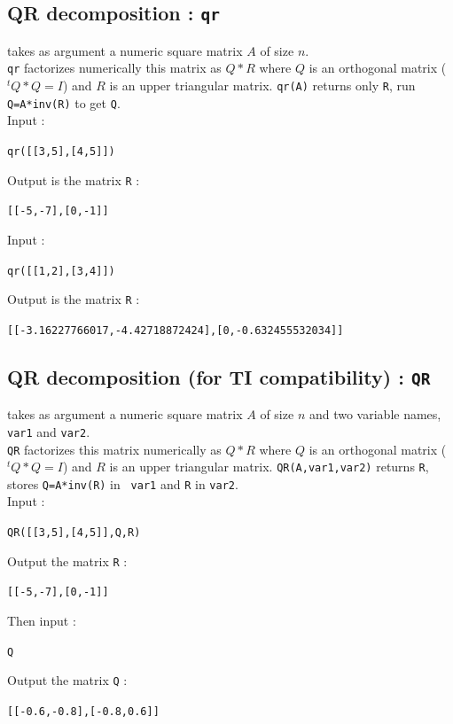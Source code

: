 \documentclass[a4paper,11pt]{book}
\begin{document}
\subsection{QR decomposition : {\tt qr}}
 takes as argument a numeric
square matrix $A$ of size $n$.\\
{\tt qr} factorizes  numerically 
this matrix as $Q*R$ where
$Q$ is an orthogonal matrix (${}^tQ*Q=I$) and $R$ is an upper triangular 
matrix. 
{\tt qr(A)} returns only {\tt R}, run {\tt Q=A*inv(R)} to get {\tt Q}.\\
Input :
\begin{center}{\tt qr([[3,5],[4,5]])}\end{center}
Output is the matrix {\tt R} :
\begin{center}{\tt [[-5,-7],[0,-1]]}\end{center}
Input :
\begin{center}{\tt qr([[1,2],[3,4]])}\end{center}
Output is the matrix {\tt R} :
\begin{center}{\tt [[-3.16227766017,-4.42718872424],[0,-0.632455532034]] }\end{center}

\subsection{QR decomposition (for TI compatibility) : {\tt QR}}
 takes as argument a numeric square matrix $A$ of size 
$n$ and two variable names, {\tt var1} and {\tt var2}.\\
{\tt QR} factorizes this matrix  numerically as $Q*R$ where
$Q$ is an orthogonal matrix (${}^tQ*Q=I$) and $R$ is an upper triangular 
matrix. {\tt QR(A,var1,var2)} returns {\tt R}, stores {\tt Q=A*inv(R)} in {\tt
  var1} and {\tt R} in {\tt var2}.\\
Input :
\begin{center}{\tt QR([[3,5],[4,5]],Q,R)}\end{center}
Output the matrix {\tt R} :
\begin{center}{\tt [[-5,-7],[0,-1]]}\end{center}
Then input :
\begin{center}{\tt Q}\end{center}
Output the matrix {\tt Q} :
\begin{center}{\tt [[-0.6,-0.8],[-0.8,0.6]]}\end{center}
\end{document}
